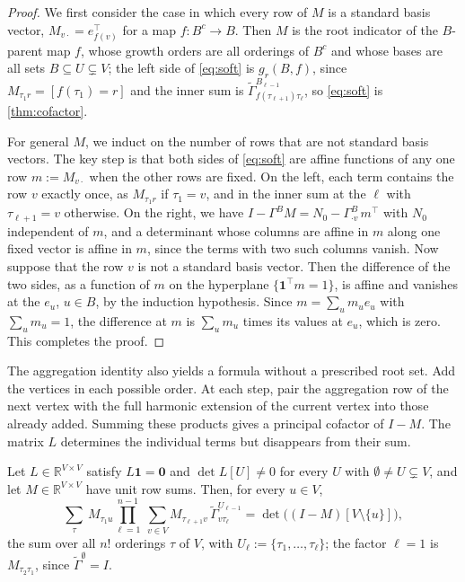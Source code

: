 \documentclass[onefignum,onetabnum,nohypdvips]{siamart250211}
\numberwithin{theorem}{section}
\numberwithin{equation}{section}
\newcommand{\R}{\mathbb{R}}
\newcommand{\one}{\mathbf{1}}
\newcommand{\zero}{\mathbf{0}}
\begin{document}
\begin{proof}
We first consider the case in which every row of $M$ is a standard
basis vector, $M_{v\cdot}=e_{f(v)}^{\top}$ for a map $f:B^c\to B$. Then $M$ is the root
indicator of the $B$-parent map $f$, whose growth orders are all
orderings of $B^c$ and whose bases are all sets $B\subseteq U\subsetneq V$;
the left side of \eqref{eq:soft} is $g_r(B,f)$, since
$M_{\tau_1r}=[f(\tau_1)=r]$
and the inner sum is
$\tilde\Gamma^{B_{\ell-1}}_{f(\tau_{\ell+1})\tau_\ell}$,
so \eqref{eq:soft} is \cref{thm:cofactor}.

For general $M$, we induct on the number of rows that are not standard
basis vectors. The key step is that both sides of \eqref{eq:soft} are affine
functions of any one row $m:=M_{v\cdot}$ when the other rows are fixed.
On the left, each term contains the row $v$ exactly once, as
$M_{\tau_1r}$ if $\tau_1=v$, and in the inner sum at the $\ell$ with
$\tau_{\ell+1}=v$ otherwise. On the right, we have
$I-\Gamma^BM=N_0-\Gamma^B_{\cdot v}\,m^{\top}$ with $N_0$ independent of
$m$, and a determinant whose columns are affine in $m$ along one fixed
vector is affine in $m$, since the terms with two such columns vanish.
Now suppose that the row $v$ is not a standard basis vector. Then the
difference of the two sides, as a function of $m$ on the hyperplane
$\{\one^{\top}m=1\}$, is affine and vanishes at the $e_u$, $u\in B$, by
the induction hypothesis. Since $m=\sum_um_ue_u$ with $\sum_um_u=1$, the
difference at $m$ is $\sum_um_u$ times its values at $e_u$, which is
zero. This completes the proof.
\end{proof}

The aggregation identity also yields a formula without a prescribed
root set. Add the vertices in each possible order. At each step,
pair the aggregation row of the next vertex with the full harmonic
extension of the current vertex into those already added.
Summing these products gives a principal cofactor of $I-M$.
The matrix $L$ determines the individual terms but disappears from
their sum.

\begin{proposition}\label{prop:reduced}
Let $L\in\R^{V\times V}$ satisfy $L\one=\zero$ and $\det L[U]\ne0$ for
every $U$ with $\emptyset\ne U\subsetneq V$, and let $M\in\R^{V\times V}$
have unit row sums. Then, for every $u\in V$,
\begin{equation}\label{eq:reduced}
\sum_{\tau}\ M_{\tau_1 u}\prod_{\ell=1}^{n-1}\
\sum_{v\in V}M_{\tau_{\ell+1}v}\,\tilde\Gamma^{U_{\ell-1}}_{v\tau_\ell}
=\det\big((I-M)[V\setminus\{u\}]\big),
\end{equation}
the sum over all $n!$ orderings $\tau$ of $V$, with
$U_\ell:=\{\tau_1,\dots,\tau_\ell\}$; the factor $\ell=1$ is $M_{\tau_2\tau_1}$,
since $\tilde\Gamma^{\emptyset}=I$.
\end{proposition}
\end{document}
